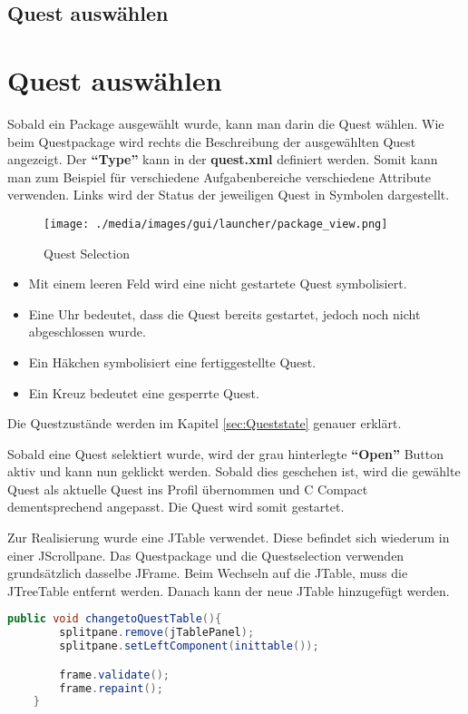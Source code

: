 \iffabian
	\subsection{Quest auswählen}
\else
	\section{Quest auswählen}
\fi

Sobald ein Package ausgewählt wurde, kann man darin die Quest wählen. Wie beim Questpackage wird rechts die Beschreibung der ausgewählten Quest angezeigt. Der \textbf{"`Type"'} kann in der \textbf{quest.xml} definiert werden. Somit kann man zum Beispiel für verschiedene Aufgabenbereiche verschiedene Attribute verwenden. Links wird der Status der jeweiligen Quest in Symbolen dargestellt.

\begin{figure}[h] 
  \centering
     \texttt{[image: ./media/images/gui/launcher/package\_view.png]}
  \caption{Quest Selection}
  \label{fig:Bild1}
\end{figure}

\begin{itemize}
\item Mit einem leeren Feld wird eine nicht gestartete Quest symbolisiert.
\item Eine Uhr bedeutet, dass die Quest bereits gestartet, jedoch noch nicht abgeschlossen wurde.
\item Ein Häkchen symbolisiert eine fertiggestellte Quest.
\item Ein Kreuz bedeutet eine gesperrte Quest. 
\end{itemize}

Die Questzustände werden im Kapitel \ref{sec:Queststate} genauer erklärt.

Sobald eine Quest selektiert wurde, wird der grau hinterlegte \textbf{"`Open"'} Button aktiv und kann nun geklickt werden. Sobald dies geschehen ist, wird die gewählte Quest als aktuelle Quest ins Profil übernommen und C Compact dementsprechend angepasst. Die Quest wird somit gestartet.

Zur Realisierung wurde eine JTable verwendet. Diese befindet sich wiederum in einer JScrollpane. Das Questpackage und die Questselection verwenden grundsätzlich dasselbe JFrame. Beim Wechseln auf die JTable, muss die JTreeTable entfernt werden. Danach kann der neue JTable hinzugefügt werden.
\begin{lstlisting}[language=JAVA]
	public void changetoQuestTable(){
		splitpane.remove(jTablePanel);
		splitpane.setLeftComponent(inittable());

		frame.validate();
		frame.repaint();
	}
\end{lstlisting}

